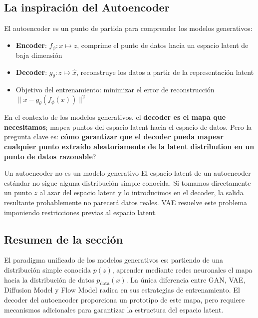 \documentclass[a4paper]{article}
\begin{document}
\subsection{La inspiración del Autoencoder}

El autoencoder es un punto de partida para comprender los modelos generativos:

\begin{itemize}
    \item \textbf{Encoder}: $f_\phi: x \mapsto z$, comprime el punto de datos hacia un espacio latent de baja dimensión
    \item \textbf{Decoder}: $g_\theta: z \mapsto \hat{x}$, reconstruye los datos a partir de la representación latent
    \item Objetivo del entrenamiento: minimizar el error de reconstrucción $\|x - g_\theta(f_\phi(x))\|^2$
\end{itemize}

En el contexto de los modelos generativos, el \textbf{decoder es el mapa que necesitamos}; mapea puntos del espacio latent hacia el espacio de datos. Pero la pregunta clave es: \textbf{cómo garantizar que el decoder pueda mapear cualquier punto extraído aleatoriamente de la latent distribution en un punto de datos razonable}?

\begin{warningbox}{Un autoencoder no es un modelo generativo}
El espacio latent de un autoencoder estándar no sigue alguna distribución simple conocida. Si tomamos directamente un punto $z$ al azar del espacio latent y lo introducimos en el decoder, la salida resultante probablemente no parecerá datos reales. VAE resuelve este problema imponiendo restricciones previas al espacio latent.
\end{warningbox}

\subsection{Resumen de la sección}

El paradigma unificado de los modelos generativos es: partiendo de una distribución simple conocida $p(z)$, aprender mediante redes neuronales el mapa hacia la distribución de datos $p_{\text{data}}(x)$. La única diferencia entre GAN, VAE, Diffusion Model y Flow Model radica en sus estrategias de entrenamiento. El decoder del autoencoder proporciona un prototipo de este mapa, pero requiere mecanismos adicionales para garantizar la estructura del espacio latent.
\end{document}
